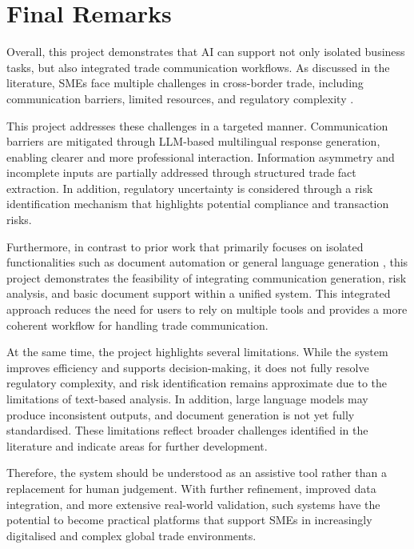 \documentclass[12pt,a4paper]{report}
\begin{document}
\section{Final Remarks}

Overall, this project demonstrates that AI can support not only isolated business tasks, but also integrated trade communication workflows. As discussed in the literature, SMEs face multiple challenges in cross-border trade, including communication barriers, limited resources, and regulatory complexity \citep{itc2021,unctad2021,oecd2021}. 

This project addresses these challenges in a targeted manner. Communication barriers are mitigated through LLM-based multilingual response generation, enabling clearer and more professional interaction. Information asymmetry and incomplete inputs are partially addressed through structured trade fact extraction. In addition, regulatory uncertainty is considered through a risk identification mechanism that highlights potential compliance and transaction risks. 

Furthermore, in contrast to prior work that primarily focuses on isolated functionalities such as document automation or general language generation \citep{oecd_doc,ozturk2024}, this project demonstrates the feasibility of integrating communication generation, risk analysis, and basic document support within a unified system. This integrated approach reduces the need for users to rely on multiple tools and provides a more coherent workflow for handling trade communication.

At the same time, the project highlights several limitations. While the system improves efficiency and supports decision-making, it does not fully resolve regulatory complexity, and risk identification remains approximate due to the limitations of text-based analysis. In addition, large language models may produce inconsistent outputs, and document generation is not yet fully standardised. These limitations reflect broader challenges identified in the literature and indicate areas for further development.

Therefore, the system should be understood as an assistive tool rather than a replacement for human judgement. With further refinement, improved data integration, and more extensive real-world validation, such systems have the potential to become practical platforms that support SMEs in increasingly digitalised and complex global trade environments.


\clearpage
\renewcommand{\bibname}{References}
\end{document}
